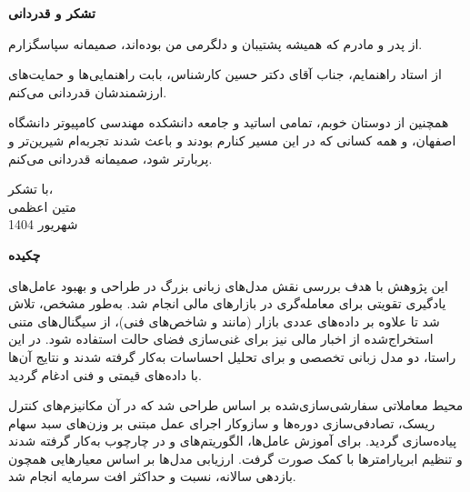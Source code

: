 \documentclass[12pt, a4paper]{report}
\begin{document}
	
\thispagestyle{empty} %

\begin{flushright} %
    {\Huge \textbf{تشکر و قدردانی}}
    
    \vspace{1.5cm} %
    
    از پدر و مادرم که همیشه پشتیبان و دلگرمی من بوده‌اند، صمیمانه سپاسگزارم.
    
    \vspace{0.8cm} %
    
    از استاد راهنمایم، جناب آقای دکتر حسین کارشناس، بابت راهنمایی‌ها و حمایت‌های ارزشمندشان قدردانی می‌کنم.
    
    \vspace{0.8cm}
    
    همچنین از دوستان خوبم، تمامی اساتید و جامعه دانشکده مهندسی کامپیوتر دانشگاه اصفهان، و همه کسانی که در این مسیر کنارم بودند و باعث شدند تجربه‌ام شیرین‌تر و پربارتر شود، صمیمانه قدردانی می‌کنم.
\end{flushright}

    \vspace{1.0cm}


\begin{flushleft}
با تشکر، \\
متین اعظمی \\
شهریور 1404
\end{flushleft}


\vfill



\newpage

\thispagestyle{empty}

\begin{flushright}
    {\Huge \textbf{چکیده}}
\end{flushright}

\vspace{1cm}

این پژوهش با هدف بررسی نقش مدل‌های زبانی بزرگ در طراحی و بهبود عامل‌های یادگیری تقویتی برای معامله‌گری در بازارهای مالی انجام شد.  
به‌طور مشخص، تلاش شد تا علاوه بر داده‌های عددی بازار (مانند  و شاخص‌های فنی)، از سیگنال‌های متنی استخراج‌شده از اخبار مالی نیز برای غنی‌سازی فضای حالت استفاده شود.  
در این راستا، دو مدل زبانی تخصصی  و  برای تحلیل احساسات به‌کار گرفته شدند و نتایج آن‌ها با داده‌های قیمتی و فنی ادغام گردید.  

محیط معاملاتی سفارشی‌سازی‌شده بر اساس  طراحی شد که در آن مکانیزم‌های کنترل ریسک، تصادفی‌سازی دوره‌ها و سازوکار اجرای عمل مبتنی بر وزن‌های سبد سهام پیاده‌سازی گردید.  
برای آموزش عامل‌ها، الگوریتم‌های  و  در چارچوب  به‌کار گرفته شدند و تنظیم ابرپارامترها با کمک  صورت گرفت.  
ارزیابی مدل‌ها بر اساس معیارهایی همچون بازدهی سالانه، نسبت  و حداکثر افت سرمایه انجام شد.  
\end{document}
